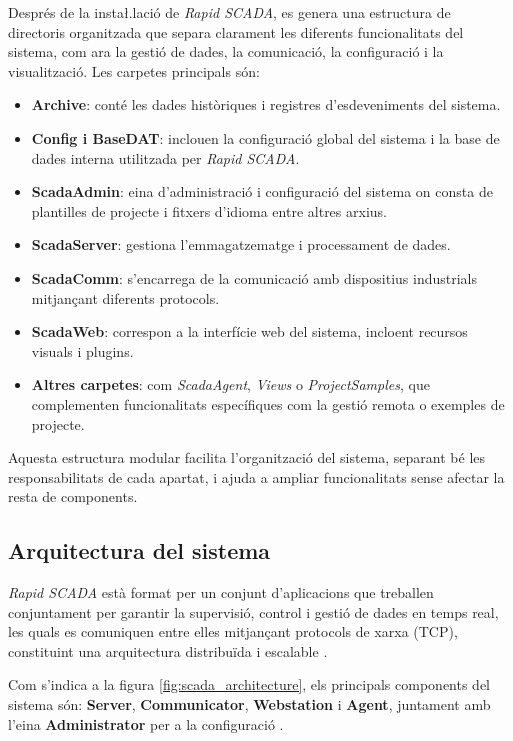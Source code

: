 \documentclass[a4paper,11pt,DIV=13,headings=normal,abstract=true,twoside=semi]{article}
\newcommand{\acro}[1]{\textsc{#1}}
\begin{document}
Després de la insta\l.lació de \emph{Rapid SCADA}, es genera una estructura de directoris organitzada que separa clarament les diferents funcionalitats del sistema, com ara la gestió de dades, la comunicació, la configuració i la visualització. Les carpetes principals són:

\begin{itemize}
    \item \textbf{Archive}: conté les dades històriques i registres d'esdeveniments del sistema.     
    \item \textbf{Config i BaseDAT}: inclouen la configuració global del sistema i la base de dades interna utilitzada per \emph{Rapid SCADA}.
    \item \textbf{ScadaAdmin}: eina d'administració i configuració del sistema on consta de plantilles de projecte i fitxers d'idioma entre altres arxius.
    \item \textbf{ScadaServer}: gestiona l'emmagatzematge i processament de dades.
    \item \textbf{ScadaComm}: s'encarrega de la comunicació amb dispositius industrials mitjançant diferents protocols.
    \item \textbf{ScadaWeb}: correspon a la interfície web del sistema, incloent recursos visuals i plugins.
    \item \textbf{Altres carpetes}: com \emph{ScadaAgent}, \emph{Views} o \emph{ProjectSamples}, que complementen funcionalitats específiques com la gestió remota o exemples de projecte.
\end{itemize}

Aquesta estructura modular facilita l'organització del sistema, separant bé les responsabilitats de cada apartat, i ajuda a ampliar funcionalitats sense afectar la resta de components.

\subsection{Arquitectura del sistema}

\emph{Rapid SCADA} està format per un conjunt d'aplicacions que treballen conjuntament per garantir la supervisió, control i gestió de dades en temps real, les quals es comuniquen entre elles mitjançant protocols de xarxa (\acro{TCP}), constituint una arquitectura distribuïda i escalable \cite{rapidscada_architecture}.

Com s'indica a la figura \ref{fig:scada_architecture}, els principals components del sistema són: \textbf{Server}, \textbf{Communicator}, \textbf{Webstation} i \textbf{Agent}, juntament amb l'eina \textbf{Administrator} per a la configuració \cite{rapidscada_apps}.
\end{document}
